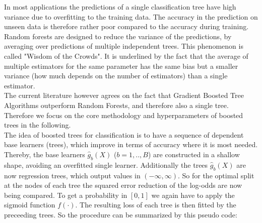 \documentclass[12pt,titlepage]{article}
\begin{document}
In most applications the predictions of a single classification tree have high variance due to overfitting to the training data. The accuracy in the prediction on unseen data is therefore rather poor compared to the accuracy during training. Random forests \cite{randomforest} are designed to reduce the variance of the predictions, by averaging over predictions of multiple independent trees. This phenomenon is called "Wisdom of the Crowds". It is underlined by the fact that the average of multiple estimators for the same parameter has the same bias but a smaller variance (how much depends on the number of estimators) than a single estimator. \\
The current literature however agrees on the fact that Gradient Boosted Tree Algorithms outperform Random Forests, and therefore also a single tree. Therefore we focus on the core methodology and hyperparameters of boosted trees in the following. \\
The idea of boosted trees for classification is to have a sequence of dependent base learners (trees), which improve in terms of accuracy where it is most needed. Thereby, the base learners $\hat{g}_{b}(X)$ ($b=1,..,B$) are constructed in a shallow shape, avoiding an overfitted single learner. Additionally the trees $\hat{g}_{b}(X)$ are now regression trees, which output values in $(-\infty, \infty)$. So for the optimal split at the nodes of each tree the squared error reduction of the log-odds are now being compared. To get a probability in $[0, 1]$ we again have to apply the sigmoid function $f(\cdot)$. The resulting loss of each tree is then fitted by the preceeding trees. So the procedure can be summarized by this pseudo code: \\
\end{document}
